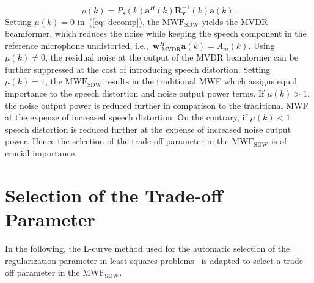 \documentclass{article}
\begin{document}
\begin{equation}
\label{eq: rho}
\rho(k) = P_s(k) \mathbf{a}^H(k)\mathbf{R}^{-1}_{\mathbf{v}}(k)\mathbf{a}(k).
\end{equation}
Setting $\mu(k) = 0$ in~(\ref{eq: decomp}), the $\text{MWF}_{\text{SDW}}$ yields the MVDR beamformer, which reduces the noise while keeping the speech component in the reference microphone undistorted, i.e.,~$\mathbf{w}_{{\text{ MVDR}}}^H \mathbf{a}(k) = A_m(k)$.
Using $\mu(k) \neq 0$, the residual noise at the output of the MVDR beamformer can be further suppressed at the cost of introducing speech distortion.
Setting $\mu(k)=1$, the $\text{MWF}_{\text{SDW}}$ results in the traditional MWF which assigns equal importance to the speech distortion and noise output power terms. 
If $\mu(k) > 1$, the noise output power is reduced further in comparison to the traditional MWF at the expense of increased speech distortion. 
On the contrary, if $\mu(k) < 1$ speech distortion is reduced further at the expense of increased noise output power.
Hence the selection of the trade-off parameter in the $\text{MWF}_{\text{SDW}}$ is of crucial importance. 

\vspace{-0.25cm}
\section{Selection of the Trade-off Parameter}
In the following, the L-curve method used for the automatic selection of the regularization parameter in least squares problems~\cite{Hansen_SIAM_1993,Kodrasi_ITASLP_2013} is adapted to select a trade-off parameter in the $\text{MWF}_{\text{SDW}}$.
\end{document}
